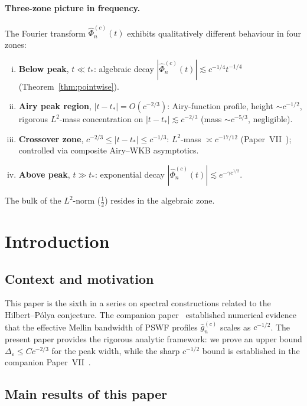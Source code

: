 \documentclass[12pt,a4paper]{amsart}
\theoremstyle{definition}
\theoremstyle{remark}
\begin{document}
\paragraph{Three-zone picture in frequency.}
The Fourier transform $\widehat\Phi_n^{(c)}(t)$
exhibits qualitatively different behaviour in four zones:
\begin{enumerate}[(i)]
\item \textbf{Below peak}, $t\ll t_*$:
algebraic decay $|\widehat\Phi_n^{(c)}(t)|\lesssim c^{-1/4}t^{-1/4}$
(Theorem~\ref{thm:pointwise}).
\item \textbf{Airy peak region}, $|t-t_*|=O(c^{-2/3})$:
Airy-function profile, height $\sim c^{-1/2}$,
rigorous $L^2$-mass concentration on $|t-t_*|\lesssim c^{-2/3}$
(mass $\sim c^{-5/3}$, negligible).
\item \textbf{Crossover zone}, $c^{-2/3}\le|t-t_*|\le c^{-1/3}$:
$L^2$-mass $\asymp c^{-17/12}$ (Paper~VII~\cite{PaperVII});
controlled via composite Airy--WKB asymptotics.
\item \textbf{Above peak}, $t\gg t_*$:
exponential decay $|\widehat\Phi_n^{(c)}(t)|\lesssim e^{-\gamma c^{1/2}}$.
\end{enumerate}
The bulk of the $L^2$-norm ($\tfrac{1}{2}$) resides in the algebraic zone.

\section{Introduction}
\label{sec:intro}

\subsection{Context and motivation}

This paper is the sixth in a series on spectral constructions
related to the Hilbert--P\'olya conjecture.
The companion paper~\cite{PaperV} established numerical evidence
that the effective Mellin bandwidth of PSWF profiles
$\widehat{g}_n^{(c)}$ scales as $c^{-1/2}$.
The present paper provides the rigorous analytic framework:
we prove an upper bound $\Delta_\varepsilon \le C c^{-2/3}$
for the peak width, while the sharp $c^{-1/2}$ bound is
established in the companion Paper~VII~\cite{PaperVII}.

\subsection{Main results of this paper}
\label{ssec:main-results}
\end{document}
